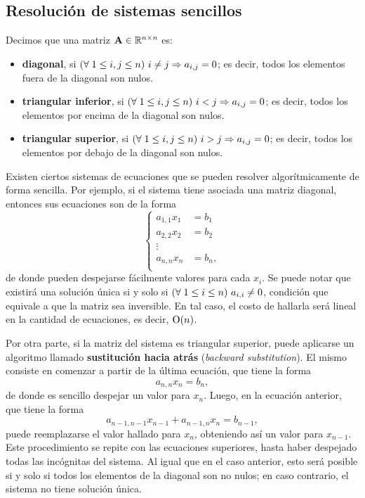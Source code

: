 \subsection{Resolución de sistemas sencillos}

Decimos que una matriz $\mathbf{A} \in \mathbb{R}^{n \times n}$ es:
\begin{itemize}[itemsep=0em]
\item \textbf{diagonal}, si $\left(\forall\;1 \leq i,j \leq n\right)\, i \neq j \Rightarrow a_{i,j} = 0$;
    es decir, todos los elementos fuera de la diagonal son nulos.
\item \textbf{triangular inferior}, si $\left(\forall\;1 \leq i,j \leq n\right)\, i < j \Rightarrow a_{i,j} = 0$;
    es decir, todos los elementos por encima de la diagonal son nulos.
\item \textbf{triangular superior}, si $\left(\forall\;1 \leq i,j \leq n\right)\, i > j \Rightarrow a_{i,j} = 0$;
    es decir, todos los elementos por debajo de la diagonal son nulos.
\end{itemize}

Existen ciertos sistemas de ecuaciones que se pueden resolver algorítmicamente
de forma sencilla. Por ejemplo, si el sistema tiene asociada una matriz
diagonal, entonces sus ecuaciones son de la forma
\[ \left\lbrace \begin{aligned}
    a_{1,1} x_1 &= b_1 \\
    a_{2,2} x_2 &= b_2 \\
    \vdots \\
    a_{n,n} x_n &= b_n, \\
\end{aligned} \right. \]
de donde pueden despejarse fácilmente valores para cada $x_i$. Se puede notar
que existirá una solución única si y solo si $\left(\forall\;1 \leq i \leq n\right)\, a_{i,i}
\neq 0$, condición que equivale a que la matriz sea inversible. En tal caso,
el costo de hallarla será lineal en la cantidad de ecuaciones, es decir,
$\mathrm{O}(n)$.

Por otra parte, si la matriz del sistema es triangular superior, puede
aplicarse un algoritmo llamado \textbf{sustitución hacia atrás}
(\emph{backward substitution}). El mismo consiste en comenzar a partir de la
última ecuación, que tiene la forma
\[ a_{n,n} x_n = b_n, \]
de donde es sencillo despejar un valor para $x_n$. Luego, en la ecuación
anterior, que tiene la forma
\[ a_{n-1,n-1} x_{n-1} + a_{n-1,n} x_n = b_{n-1}, \]
puede reemplazarse el valor hallado para $x_n$, obteniendo así un valor para
$x_{n-1}$. Este procedimiento se repite con las ecuaciones superiores,
hasta haber despejado todas las incógnitas del sistema. Al igual que en el
caso anterior, esto será posible si y solo si todos los elementos de la
diagonal son no nulos; en caso contrario, el sistema no tiene solución única.

